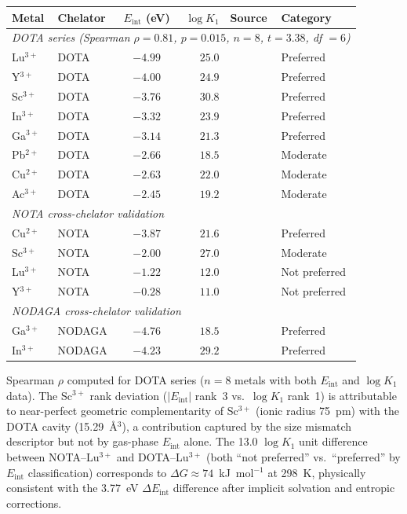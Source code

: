 \documentclass[journal=jacsat,manuscript=suppinfo]{achemso}
\begin{document}
\begin{table}[h!]
  \centering
  \begin{tabular}{@{}llcrll@{}}
    \toprule
    Metal & Chelator & $E_\mathrm{int}$ (eV) & $\log K_1$ &
      Source & Category \\
    \midrule
    \multicolumn{6}{l}{\textit{DOTA series (Spearman $\rho = 0.81$,
      $p = 0.015$, $n = 8$, $t = 3.38$, df $= 6$)}} \\
    Lu$^{3+}$ & DOTA & $-4.99$ & $25.0$ & \cite{deLeonRodriguez2008} & Preferred \\
    Y$^{3+}$  & DOTA & $-4.00$ & $24.9$ & \cite{MartellSmith2004}   & Preferred \\
    Sc$^{3+}$ & DOTA & $-3.76$ & $30.8$ & \cite{Pniok2014}          & Preferred \\
    In$^{3+}$ & DOTA & $-3.32$ & $23.9$ & \cite{MartellSmith2004}   & Preferred \\
    Ga$^{3+}$ & DOTA & $-3.14$ & $21.3$ & \cite{Notni2010}          & Preferred \\
    Pb$^{2+}$ & DOTA & $-2.66$ & $18.5$ & \cite{FerrandoCliment2022}& Moderate \\
    Cu$^{2+}$ & DOTA & $-2.63$ & $22.0$ & \cite{MartellSmith2004}   & Moderate \\
    Ac$^{3+}$ & DOTA & $-2.45$ & $19.2$ & \cite{Thiele2017}         & Moderate \\
    \midrule
    \multicolumn{6}{l}{\textit{NOTA cross-chelator validation}} \\
    Cu$^{2+}$ & NOTA & $-3.87$ & $21.6$ & \cite{MartellSmith2004}   & Preferred \\
    Sc$^{3+}$ & NOTA & $-2.00$ & $27.0$ & \cite{Pniok2014}          & Moderate \\
    Lu$^{3+}$ & NOTA & $-1.22$ & $12.0$ & \cite{MartellSmith2004}   & Not preferred \\
    Y$^{3+}$  & NOTA & $-0.28$ & $11.0$ & \cite{MartellSmith2004}   & Not preferred \\
    \midrule
    \multicolumn{6}{l}{\textit{NODAGA cross-chelator validation}} \\
    Ga$^{3+}$ & NODAGA & $-4.76$ & $18.5$ & \cite{Notni2010} & Preferred \\
    In$^{3+}$ & NODAGA & $-4.23$ & $29.2$ & \cite{Morgan2023} & Preferred \\
    \bottomrule
  \end{tabular}
\end{table}

Spearman $\rho$ computed for DOTA series ($n = 8$ metals with both $E_\mathrm{int}$
and $\log K_1$ data).
The Sc$^{3+}$ rank deviation ($|E_\mathrm{int}|$ rank~3 vs.\ $\log K_1$ rank~1)
is attributable to near-perfect geometric complementarity of Sc$^{3+}$ (ionic
radius 75~pm) with the DOTA cavity (15.29~\AA$^3$), a contribution captured by
the size mismatch descriptor but not by gas-phase $E_\mathrm{int}$ alone.
The 13.0 $\log K_1$ unit difference between NOTA--Lu$^{3+}$ and DOTA--Lu$^{3+}$
(both ``not preferred'' vs.\ ``preferred'' by $E_\mathrm{int}$ classification)
corresponds to $\Delta G \approx 74$~kJ~mol$^{-1}$ at 298~K, physically
consistent with the 3.77~eV $\Delta E_\mathrm{int}$ difference after
implicit solvation and entropic corrections.
\end{document}
